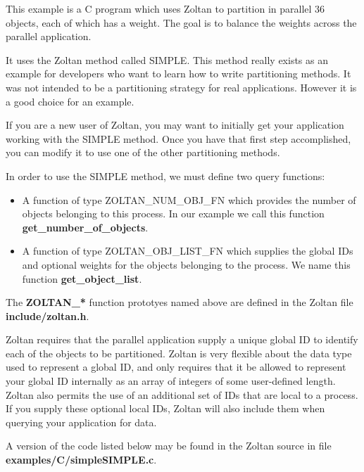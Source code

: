 This example is a C program which uses Zoltan to partition
in parallel 36 objects, each of which has a weight.  The goal is
to balance the weights across the parallel application.

It uses the Zoltan method called SIMPLE. 
This method really exists as an example for developers
who want to learn how to write partitioning methods.  It was
not intended to be a partitioning strategy for real applications.
However it is a good choice for an example.  

If you are a new user of Zoltan, you may want to initially get your
application working with the SIMPLE method.  Once you have
that first step accomplished, you can modify it to use one of the
other partitioning methods.

In order to use the SIMPLE method, we must define two query functions:

\begin{itemize}
\item A function of type ZOLTAN\_NUM\_OBJ\_FN which provides the number of objects belonging to this process.  In our example we call this function \textbf{get\_number\_of\_objects}.
\item A function of type ZOLTAN\_OBJ\_LIST\_FN which supplies the global IDs and optional weights for the objects belonging to the process.  We name this function \textbf{get\_object\_list}.
\end{itemize}

The \textbf{ZOLTAN\_*} function prototyes named above
are defined in the Zoltan file \textbf{include/zoltan.h}.

Zoltan requires that the parallel application supply a unique 
global ID to identify each of the objects to be partitioned.
Zoltan is very flexible about the data type used to represent
a global ID, and only requires that it be allowed to represent
your global ID internally as an array of integers of some user-defined
length.  Zoltan also permits the use of an additional set of
IDs that are local to a process.  If you supply these optional local IDs,
Zoltan will also include them when querying your application for data.

A version of the 
code listed below may be found in the Zoltan source in file
\textbf{examples/C/simpleSIMPLE.c}. 

